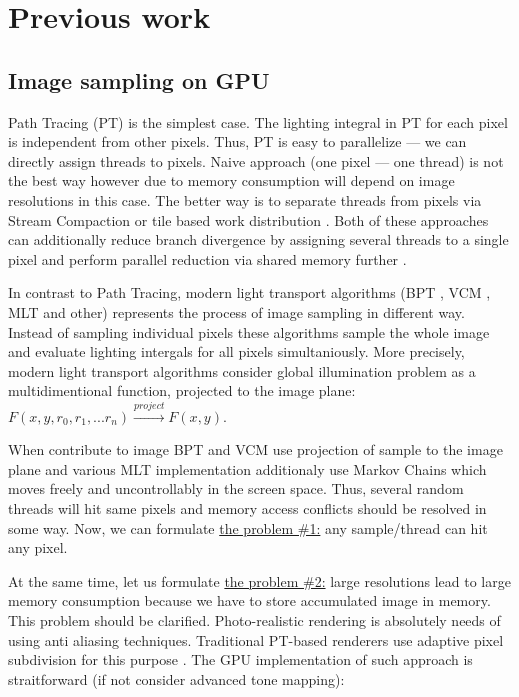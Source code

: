 \documentclass[twoside,twocolumn,10pt]{article}
\begin{document}
\section{Previous work}

\subsection*{Image sampling on GPU}

Path Tracing (PT) \cite{Kajiya86} is the simplest case. The lighting integral in PT for each pixel is independent from other pixels. Thus, PT is easy to parallelize --- we can directly assign threads to pixels. Naive approach (one pixel --- one thread) is not the best way however due to memory consumption will depend on image resolutions in this case. The better way is to separate threads from pixels via Stream Compaction \cite{Antwerpen11} or tile based work distribution \cite{frolov11}. Both of these approaches can additionally reduce branch divergence by assigning several threads to a single pixel and perform parallel reduction via shared memory further \cite{Harris07}.
 
In contrast to Path Tracing, modern light transport algorithms (BPT \cite{Veach98}, VCM \cite{Georgiev12}, MLT \cite{Veach97,Kelemen02,Hachisuka14} and other) represents the process of image sampling in different way. Instead of sampling individual pixels these algorithms sample the whole image and evaluate lighting intergals for all pixels simultaniously. More precisely, modern light transport algorithms consider global illumination problem as a multidimentional function, projected to the image plane: $F(x,y,r_0,r_1, ... r_n) \xrightarrow{project} F(x,y)$. 

When contribute to image BPT and VCM use projection of sample to the image plane and various MLT implementation additionaly use Markov Chains which moves freely and uncontrollably in the screen space. Thus, several random threads will hit same pixels and memory access conflicts should be resolved in some way. Now, we can formulate \underline{the problem \#1:} any sample/thread can hit any pixel. 

At the same time, let us formulate \underline{the problem \#2:} large resolutions lead to large memory consumption because we have to store accumulated image in memory. This problem should be clarified. Photo-realistic rendering is absolutely needs of using anti aliasing techniques. Traditional PT-based renderers use adaptive pixel subdivision for this purpose \cite{VRayDMC}. The GPU implementation of such approach is straitforward (if not consider advanced tone mapping): 
\end{document}
